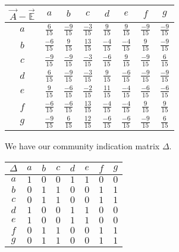 \documentclass[a4paper, 10pt, twocolumn]{article}
\begin{document}
\begin{center}
       \begin{tabular}{c|ccccccc} 
              $ \vec{A} - \vec{\mathbb{E}} $ & $ a $ & $ b $ & $ c $ & $ d $ & $ e $ & $ f $ & $ g $ \\
              \hline
              $ a $ & $ \frac{6}{15}  $ & $ \frac{-9}{15} $ & $ \frac{-3}{15} $ & $ \frac{9}{15}  $ & $ \frac{9}{15}  $ & $ \frac{-9}{15} $ & $ \frac{-9}{15} $ \\
              $ b $ & $ \frac{-6}{15} $ & $ \frac{9}{15}  $ & $ \frac{13}{15} $ & $ \frac{-4}{15} $ & $ \frac{-4}{15} $ & $ \frac{9}{15}  $ & $ \frac{-9}{15} $ \\
              $ c $ & $ \frac{-9}{15} $ & $ \frac{-9}{15} $ & $ \frac{-3}{15} $ & $ \frac{-6}{15} $ & $ \frac{9}{15}  $ & $ \frac{-9}{15} $ & $ \frac{6}{15}  $ \\
              $ d $ & $ \frac{6}{15}  $ & $ \frac{-9}{15} $ & $ \frac{-3}{15} $ & $ \frac{9}{15}  $ & $ \frac{-6}{15} $ & $ \frac{-9}{15} $ & $ \frac{-9}{15} $ \\
              $ e $ & $ \frac{9}{15}  $ & $ \frac{-6}{15} $ & $ \frac{-2}{15} $ & $ \frac{11}{15} $ & $ \frac{-4}{15} $ & $ \frac{-6}{15} $ & $ \frac{-6}{15} $ \\
              $ f $ & $ \frac{-6}{15} $ & $ \frac{-6}{15} $ & $ \frac{13}{15} $ & $ \frac{-4}{15} $ & $ \frac{-4}{15} $ & $ \frac{9}{15}  $ & $ \frac{9}{15}  $ \\
              $ g $ & $ \frac{-9}{15} $ & $ \frac{6}{15}  $ & $ \frac{12}{15} $ & $ \frac{-6}{15} $ & $ \frac{-6}{15} $ & $ \frac{-9}{15} $ & $ \frac{6}{15}  $ \\
       \end{tabular}
\end{center}

\noindent
We have our community indication matrix $ \varDelta $.

\begin{center}
       \begin{tabular}{c|ccccccc} 
              $ \varDelta  $ & $ a $ & $ b $ & $ c $ & $ d $ & $ e $ & $ f $ & $ g $ \\
              \hline
              $ a $ & $ 1 $ & $ 0 $ & $ 0 $ & $ 1 $ & $ 1 $ & $ 0 $ & $ 0 $ \\
              $ b $ & $ 0 $ & $ 1 $ & $ 1 $ & $ 0 $ & $ 0 $ & $ 1 $ & $ 1 $ \\
              $ c $ & $ 0 $ & $ 1 $ & $ 1 $ & $ 0 $ & $ 0 $ & $ 1 $ & $ 1 $ \\
              $ d $ & $ 1 $ & $ 0 $ & $ 0 $ & $ 1 $ & $ 1 $ & $ 0 $ & $ 0 $ \\
              $ e $ & $ 1 $ & $ 0 $ & $ 0 $ & $ 1 $ & $ 1 $ & $ 0 $ & $ 0 $ \\
              $ f $ & $ 0 $ & $ 1 $ & $ 1 $ & $ 0 $ & $ 0 $ & $ 1 $ & $ 1 $ \\
              $ g $ & $ 0 $ & $ 1 $ & $ 1 $ & $ 0 $ & $ 0 $ & $ 1 $ & $ 1 $ \\
       \end{tabular}
\end{center}
\end{document}
